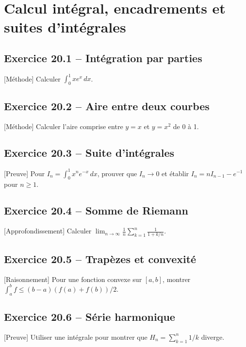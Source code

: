 \chapter{Calcul intégral, encadrements et suites d’intégrales}
\section*{Exercice 20.1 -- Intégration par parties}
[Méthode] Calculer $\int_0^1xe^x\,dx$.

\section*{Exercice 20.2 -- Aire entre deux courbes}
[Méthode] Calculer l'aire comprise entre $y=x$ et $y=x^2$ de 0 à 1.

\section*{Exercice 20.3 -- Suite d’intégrales}
[Preuve] Pour $I_n=\int_0^1x^ne^{-x}\,dx$, prouver que $I_n\to0$ et établir $I_n=nI_{n-1}-e^{-1}$ pour $n\ge1$.

\section*{Exercice 20.4 -- Somme de Riemann}
[Approfondissement] Calculer $\lim_{n\to\infty}\frac1n\sum_{k=1}^n\frac1{1+k/n}$.

\section*{Exercice 20.5 -- Trapèzes et convexité}
[Raisonnement] Pour une fonction convexe sur $[a,b]$, montrer $\int_a^bf\le(b-a)(f(a)+f(b))/2$.

\section*{Exercice 20.6 -- Série harmonique}
[Preuve] Utiliser une intégrale pour montrer que $H_n=\sum_{k=1}^n1/k$ diverge.
